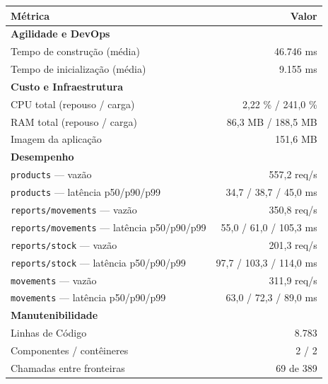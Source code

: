 \begin{quadro}[htb]
  \centering
  \caption{Métricas do sistema de inventário no baseline (Snapshot 0).}
  \label{qua:metricas-inventario-s0}
  \renewcommand{\arraystretch}{1.15}
  \begin{tabular}{|l|r|}
    \hline
    \textbf{Métrica} & \textbf{Valor} \\ \hline
    \multicolumn{2}{|l|}{\textbf{Agilidade e DevOps}} \\ \hline
    Tempo de construção (média) & 46.746 ms \\
    Tempo de inicialização (média) & 9.155 ms \\ \hline
    \multicolumn{2}{|l|}{\textbf{Custo e Infraestrutura}} \\ \hline
    CPU total (repouso / carga) & 2,22 \% / 241,0 \% \\
    RAM total (repouso / carga) & 86,3 MB / 188,5 MB \\
    Imagem da aplicação & 151,6 MB \\ \hline
    \multicolumn{2}{|l|}{\textbf{Desempenho}} \\ \hline
    \texttt{products} --- vazão & 557,2 req/s \\
    \texttt{products} --- latência p50/p90/p99 & 34,7 / 38,7 / 45,0 ms \\
    \texttt{reports/movements} --- vazão & 350,8 req/s \\
    \texttt{reports/movements} --- latência p50/p90/p99 & 55,0 / 61,0 / 105,3 ms \\
    \texttt{reports/stock} --- vazão & 201,3 req/s \\
    \texttt{reports/stock} --- latência p50/p90/p99 & 97,7 / 103,3 / 114,0 ms \\
    \texttt{movements} --- vazão & 311,9 req/s \\
    \texttt{movements} --- latência p50/p90/p99 & 63,0 / 72,3 / 89,0 ms \\ \hline
    \multicolumn{2}{|l|}{\textbf{Manutenibilidade}} \\ \hline
    Linhas de Código & 8.783 \\
    Componentes / contêineres & 2 / 2 \\
    Chamadas entre fronteiras & 69 de 389 \\ \hline
  \end{tabular}
\end{quadro}
